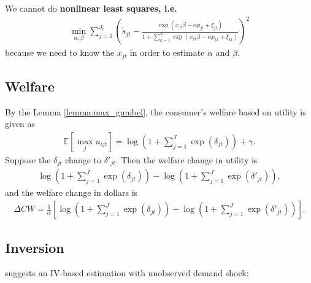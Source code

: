 \documentclass[11pt]{elegantbook}
\begin{document}
\begin{note}
    We cannot do \textbf{nonlinear least squares, i.e.}
    \begin{equation}
        \begin{aligned}
            \min_{\alpha,\beta} \sum_{j=1}^{J_t}\left(\tilde{s}_{jt}-\frac{\exp(x_{jt}\beta-\alpha p_{jt}+\xi_{jt})}{1+\sum_{k=1}^{J_t}\exp(x_{kt}\beta-\alpha p_{kt}+\xi_{kt})}\right)^2
        \end{aligned}
        \nonumber
    \end{equation}
    because we need to know the $x_{jt}$ in order to estimate $\alpha$ and $\beta$.
\end{note}

\subsection{Welfare}
By the Lemma \ref{lemma:max_gumbel}, the consumer's welfare based on utility is given as
\begin{equation}
    \begin{aligned}
        \mathbb{E}[\max_{j} u_{ijt}]=\log\left(1+\sum_{j=1}^{J}\exp(\delta_{jt})\right)+\gamma.
    \end{aligned}
    \nonumber
\end{equation}
Suppose the $\delta_{jt}$ change to $\delta'_{jt}$. Then the welfare change in utility is
\begin{equation}
    \begin{aligned}
        \log\left(1+\sum_{j=1}^{J}\exp(\delta_{jt})\right)-\log\left(1+\sum_{j=1}^{J}\exp(\delta'_{jt})\right),
    \end{aligned}
    \nonumber
\end{equation}
and the welfare change in dollars is
\begin{equation}
    \begin{aligned}
        \Delta CW=\frac{1}{\alpha}\left[\log\left(1+\sum_{j=1}^{J}\exp(\delta_{jt})\right)-\log\left(1+\sum_{j=1}^{J}\exp(\delta'_{jt})\right)\right].
    \end{aligned}
    \nonumber
\end{equation}






\subsection{Inversion}
\cite{berry1994estimating} suggests an IV-based estimation with unobserved demand shock:
\end{document}
